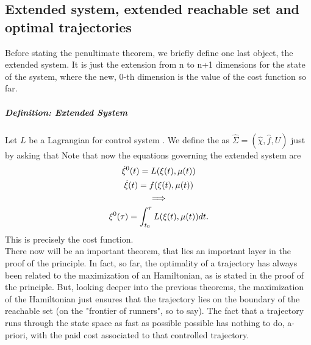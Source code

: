 \subsection{Extended system, extended reachable set and optimal trajectories}
Before stating the penultimate theorem, we briefly define one last object, the extended system. It is just the extension from n to n+1 dimensions for the state of the system, where the new, 0-th dimension is the value of the cost function so far.

\subparagraph[6.1]{Definition: Extended System} Let $L$ be a Lagrangian for control system \controlSystem. We define the  as $\hat{\Sigma}=(\hat\chi,\hat{f},U)$ just by asking that 
Note that now the equations governing the extended system are 
\begin{gather*}
	 \dot{\xi}^0(t)=L(\xi (t),\mu(t))\\
	\dot{\xi}(t)=f(\xi (t),\mu(t))\\
	\implies\\
	\xi^0(\tau)=\int_{t_0}^{\tau}L(\xi (t),\mu(t))dt.
\end{gather*}
This is precisely the cost function.\\
There now will be an important theorem, that lies an important layer in the proof of the principle. In fact, so far, the optimality of a trajectory has always been related to the maximization of an Hamiltonian, as is stated in the proof of the principle. But, looking deeper into the previous theorems, the maximization of the Hamiltonian just ensures that the trajectory lies on the boundary of the reachable set (on the "frontier of runners", so to say). The fact that a trajectory runs through the state space as fast as possible possible has nothing to do, a-priori, with the paid cost associated to that controlled trajectory. 


